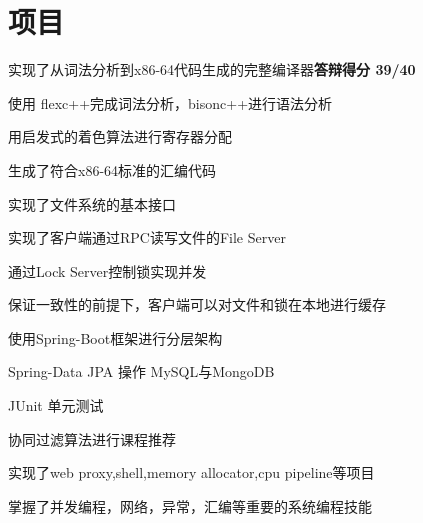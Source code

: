 \documentclass[]{deedy-resume-openfont}
\begin{document}
\begin{minipage}[t]{0.73\textwidth} 


\section{项目}
\sectionsep
{}
\vspace{\topsep}
\begin{tightemize}
    \item 实现了从词法分析到x86-64代码生成的完整编译器\textbf{答辩得分 39/40}
    \item 使用 flexc++完成词法分析，bisonc++进行语法分析
    \item 用启发式的着色算法进行寄存器分配
    \item 生成了符合x86-64标准的汇编代码
\end{tightemize}
\sectionsep

\begin{tightemize}
\item 实现了文件系统的基本接口
\item 实现了客户端通过RPC读写文件的File Server
\item 通过Lock Server控制锁实现并发
\item 保证一致性的前提下，客户端可以对文件和锁在本地进行缓存
\end{tightemize}
\sectionsep

\begin{tightemize}
\item 使用Spring-Boot框架进行分层架构
\item Spring-Data JPA 操作 MySQL与MongoDB
\item JUnit 单元测试
\item 协同过滤算法进行课程推荐
\end{tightemize}
\sectionsep

\begin{tightemize}
\item 实现了web proxy,shell,memory allocator,cpu pipeline等项目
\item 掌握了并发编程，网络，异常，汇编等重要的系统编程技能
\end{tightemize}
\sectionsep


\end{minipage}
\end{document}
